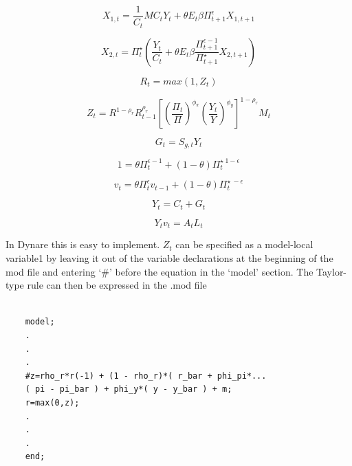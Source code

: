 \documentclass[cn,10pt,math=newtx,citestyle=gb7714-2015,bibstyle=gb7714-2015]{elegantbook}
\begin{document}
$$X_{1,t}=\frac{1}{C_t}MC_tY_t+\theta E_t\beta \Pi_{t+1}^{\epsilon}X_{1,t+1}$$

$$X_{2,t}=\Pi_t^{\star}\left(\frac{Y_t}{C_t}+\theta E_t \beta \frac{\Pi_{t+1}^{\epsilon-1}}{\Pi_{t+1}^{\star}}X_{2,t+1}\right)$$

$$R_t=max(1,Z_t)$$

$$Z_t=R^{1-\rho_r}R_{t-1}^{\rho_r}\left[\left(\frac{\Pi_t}{\Pi}\right)^{\phi_{\pi}}\left(\frac{Y_t}{Y}\right)^{\phi_y}\right]^{1-\rho_r}M_t$$

$$G_t=S_{g,t}Y_t$$

$$1=\theta\Pi_t^{\epsilon-1}+(1-\theta)\Pi_t^{\star~1-\epsilon}$$

$$v_t=\theta\Pi_t^{\epsilon}v_{t-1}+(1-\theta)\Pi_t^{\star~-\epsilon}$$

$$Y_t=C_t+G_t$$

$$Y_tv_t=A_tL_t$$

In Dynare this is easy to implement. $Z_t$ can be specified as a model-local variable1 by leaving it out of the variable declarations at the beginning of the mod file and entering ‘\#’ before the equation in the ‘model’ section. The Taylor-type rule can then be expressed in the .mod file

\begin{lstlisting}[frame=shadowbox]
	
	model;
	.
	.
	.
	#z=rho_r*r(-1) + (1 - rho_r)*( r_bar + phi_pi*...
	( pi - pi_bar ) + phi_y*( y - y_bar ) + m;
	r=max(0,z);
	.
	.
	.
	end;
	
\end{lstlisting}
\end{document}
